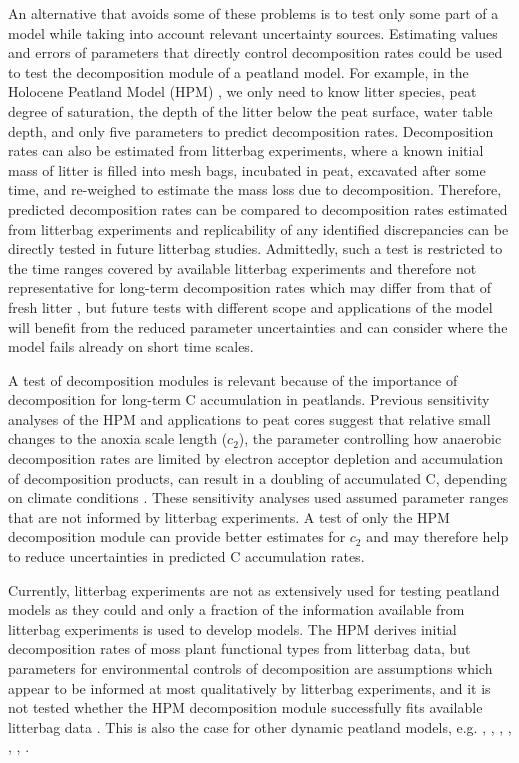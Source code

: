 \documentclass[esd, manuscript]{copernicus}
\begin{document}
An alternative that avoids some of these problems is to test only some part of a model while taking into account relevant uncertainty sources. Estimating values and errors of parameters that directly control decomposition rates could be used to test the decomposition module of a peatland model. For example, in the Holocene Peatland Model (HPM) \citep{Frolking.2010}, we only need to know litter species, peat degree of saturation, the depth of the litter below the peat surface, water table depth, and only five parameters to predict decomposition rates. Decomposition rates can also be estimated from litterbag experiments, where a known initial mass of litter is filled into mesh bags, incubated in peat, excavated after some time, and re-weighed to estimate the mass loss due to decomposition. Therefore, predicted decomposition rates can be compared to decomposition rates estimated from litterbag experiments and replicability of any identified discrepancies can be directly tested in future litterbag studies. Admittedly, such a test is restricted to the time ranges covered by available litterbag experiments and therefore not representative for long-term decomposition rates which may differ from that of fresh litter \citep[e.g.,][]{Frolking.2001}, but future tests with different scope and applications of the model will benefit from the reduced parameter uncertainties and can consider where the model fails already on short time scales.

A test of decomposition modules is relevant because of the importance of decomposition for long-term C accumulation in peatlands. Previous sensitivity analyses of the HPM and applications to peat cores suggest that relative small changes to the anoxia scale length (\(c_2\)), the parameter controlling how anaerobic decomposition rates are limited by electron acceptor depletion and accumulation of decomposition products, can result in a doubling of accumulated C, depending on climate conditions \citep{Frolking.2010, Quillet.2013a, Kurnianto.2015}. These sensitivity analyses used assumed parameter ranges that are not informed by litterbag experiments. A test of only the HPM decomposition module can provide better estimates for \(c_2\) and may therefore help to reduce uncertainties in predicted C accumulation rates.

Currently, litterbag experiments are not as extensively used for testing peatland models as they could and only a fraction of the information available from litterbag experiments is used to develop models. The HPM derives initial decomposition rates of moss plant functional types from litterbag data, but parameters for environmental controls of decomposition are assumptions which appear to be informed at most qualitatively by litterbag experiments, and it is not tested whether the HPM decomposition module successfully fits available litterbag data \citep{Frolking.2010}. This is also the case for other dynamic peatland models, e.g. \citet{Frolking.2001}, \citet{Bauer.2004}, \citet{Heijmans.2008}, \citet{Heinemeyer.2010}, \citet{Morris.2012}, \citet{Chaudhary.2018}, \citet{Bona.2020}.
\end{document}
